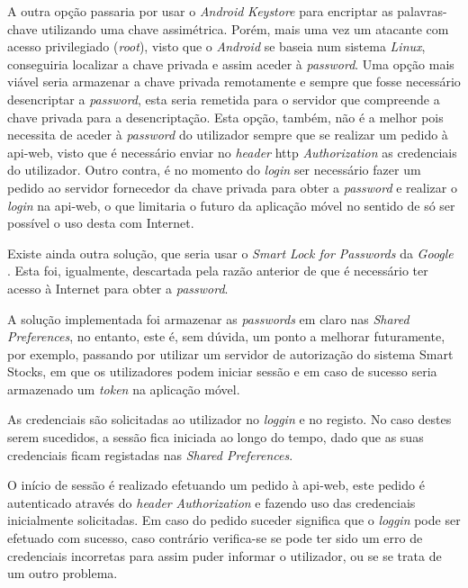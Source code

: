 A outra opção passaria por usar o \textit{Android} \textit{Keystore} para encriptar as palavras-chave utilizando uma chave assimétrica. Porém, mais uma vez um atacante com acesso privilegiado (\textit{root}), visto que o \textit{Android} se baseia num sistema \textit{Linux}, conseguiria localizar a chave privada e assim aceder à \textit{password}. Uma opção mais viável seria armazenar a chave privada remotamente e sempre que fosse necessário desencriptar a \textit{password}, esta seria remetida para o servidor que compreende a chave privada para a desencriptação. Esta opção, também, não é a melhor pois necessita de aceder à \textit{password} do utilizador sempre que se realizar um pedido à \gls{api-web}, visto que é necessário enviar no \textit{header} \acrshort{http} \textit{Authorization} as credenciais do utilizador. Outro contra, é no momento do \textit{login} ser necessário fazer um pedido ao servidor fornecedor da chave privada para obter a \textit{password} e realizar o \textit{login} na \gls{api-web}, o que limitaria o futuro da aplicação móvel no sentido de só ser possível o uso desta com Internet. 

Existe ainda outra solução, que seria usar o \textit{Smart Lock for Passwords} da \textit{Google} \cite{SmartLock:android}. Esta foi, igualmente, descartada pela razão anterior de que é necessário ter acesso à Internet para obter a \textit{password}. 

A solução implementada foi armazenar as \textit{passwords} em claro nas \textit{Shared Preferences}, no entanto, este é, sem dúvida, um ponto a melhorar futuramente, por exemplo, passando por utilizar um servidor de autorização do sistema Smart Stocks, em que os utilizadores podem iniciar sessão e em caso de sucesso seria armazenado um \textit{token} na aplicação móvel.

As credenciais são solicitadas ao utilizador no \textit{loggin} e no registo. No caso destes serem sucedidos, a sessão fica iniciada ao longo do tempo, dado que as suas credenciais ficam registadas nas \textit{Shared Preferences}.

O início de sessão é realizado efetuando um pedido à \gls{api-web}, este pedido é autenticado através do \textit{header} \textit{Authorization} e fazendo uso das credenciais inicialmente solicitadas. Em caso do pedido suceder significa que o \textit{loggin} pode ser efetuado com sucesso, caso contrário verifica-se se pode ter sido um erro de credenciais incorretas para assim puder informar o utilizador, ou se se trata de um outro problema.

